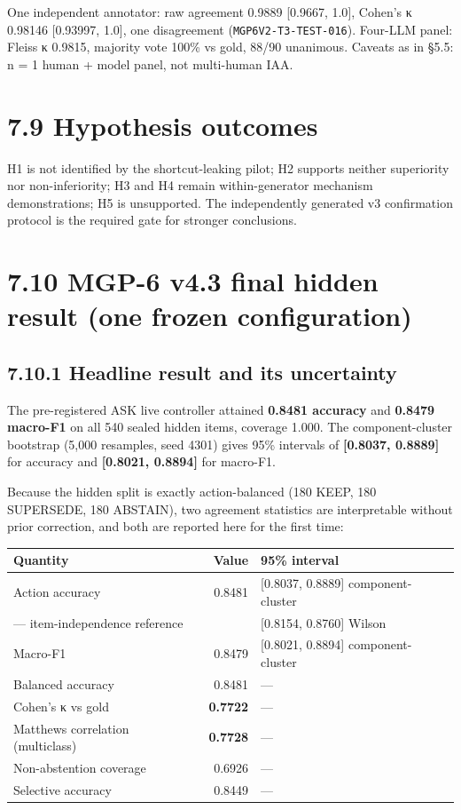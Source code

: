 One independent annotator: raw agreement 0.9889 {[}0.9667, 1.0{]},
Cohen's κ 0.98146 {[}0.93997, 1.0{]}, one disagreement
(\texttt{MGP6V2-T3-TEST-016}). Four-LLM panel: Fleiss κ 0.9815, majority
vote 100\% vs gold, 88/90 unanimous. Caveats as in §5.5: n = 1 human +
model panel, not multi-human IAA.

\section{7.9 Hypothesis outcomes}\label{hypothesis-outcomes}

H1 is not identified by the shortcut-leaking pilot; H2 supports neither
superiority nor non-inferiority; H3 and H4 remain within-generator
mechanism demonstrations; H5 is unsupported. The independently generated
v3 confirmation protocol is the required gate for stronger conclusions.

\section{7.10 MGP-6 v4.3 final hidden result (one frozen
configuration)}\label{mgp-6-v4.3-final-hidden-result-one-frozen-configuration}

\subsection{7.10.1 Headline result and its
uncertainty}\label{headline-result-and-its-uncertainty}

The pre-registered ASK live controller attained \textbf{0.8481 accuracy}
and \textbf{0.8479 macro-F1} on all 540 sealed hidden items, coverage
1.000. The component-cluster bootstrap (5,000 resamples, seed 4301)
gives 95\% intervals of \textbf{{[}0.8037, 0.8889{]}} for accuracy and
\textbf{{[}0.8021, 0.8894{]}} for macro-F1.

Because the hidden split is exactly action-balanced (180 KEEP, 180
SUPERSEDE, 180 ABSTAIN), two agreement statistics are interpretable
without prior correction, and both are reported here for the first time:

{\def\LTcaptype{none} %
\begin{longtable}[]{@{}lrl@{}}
\toprule\noalign{}
Quantity & Value & 95\% interval \\
\midrule\noalign{}
\endhead
\bottomrule\noalign{}
\endlastfoot
Action accuracy & 0.8481 & {[}0.8037, 0.8889{]} component-cluster \\
--- item-independence reference & & {[}0.8154, 0.8760{]} Wilson \\
Macro-F1 & 0.8479 & {[}0.8021, 0.8894{]} component-cluster \\
Balanced accuracy & 0.8481 & --- \\
Cohen's κ vs gold & \textbf{0.7722} & --- \\
Matthews correlation (multiclass) & \textbf{0.7728} & --- \\
Non-abstention coverage & 0.6926 & --- \\
Selective accuracy & 0.8449 & --- \\
\end{longtable}
}

